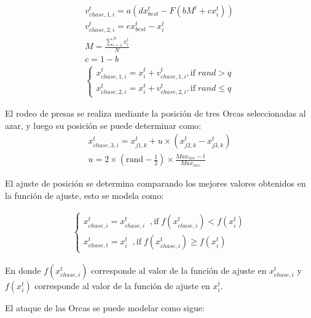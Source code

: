 \documentclass[conference]{IEEEtran}
\begin{document}
\begin{equation}
	\begin{gathered}
		v_{chase,1,i}^t = a ( d x_{best}^t - F (b M^t + c x_i^t)) \\
		v_{chase,2,i}^t = e x_{best}^t - x_{i}^t \\
		M = \frac{\sum_{i=1}^{N} x_i^t}{N} \\
		c=1-b \\
		\begin{cases}
			x_{chase,1,i}^t = x_{i}^t + v_{chase,1,i}^t , \text{if} \;rand > q     \\
			x_{chase,2,i}^t = x_{i}^t + v_{chase,2,i}^t  , \text{if} \;rand \leq q 
		\end{cases}
	\end{gathered}
	\label{eq19}
\end{equation}

\noindent El rodeo de presas se realiza mediante la posición de tres Orcas seleccionadas al azar, y luego su posición se puede determinar como:
\begin{equation}
	\begin{gathered}
		x_{chase,3,i}^t =x_{j1,k}^t +u \times (x_{j2,k}^t - x_{j3,k}^t ) \\
		u = 2 \times (\text{rand} - \frac{1}{2}) \times \frac{Max_{iter}-t}{Max_{iter}}
	\end{gathered}
	\label{eq20}
\end{equation}

\noindent El ajuste de posición se determina comparando los mejores valores obtenidos en la función de ajuste, esto se modela como:

\begin{equation}
	\begin{gathered}
		\begin{cases}
			x_{chase,i}^t = x_{chase,i}^t \;\;, \text{if} \; f(x_{chase,i}^t) < f(x_{i}^t ) \\
			x_{chase,t}^t = x_{i}^t  \;\;, \text{if} \;f(x_{chase,i}^t) \geq f(x_{i}^t )    
		\end{cases}
	\end{gathered}
	\label{eq21}
\end{equation}

\noindent En donde $f(x_{chase,i}^t)$ corresponde al valor de la función de ajuste en $x_{chase,i}^t$ y $f(x_{i}^t )$ corresponde al valor de la función de ajuste en $x_{i}^t$.

El ataque de las Orcas se puede modelar como sigue:
\end{document}
